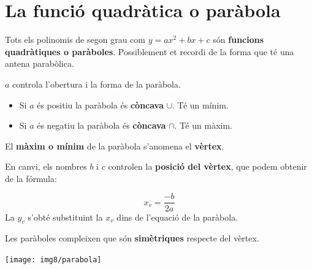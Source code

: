 \section{La funció quadràtica o paràbola}

\begin{theorybox}


Tots els polinomis de segon grau com $y=ax^2+bx+c$ són \textbf{funcions quadràtiques o paràboles}. Possiblement et recordi de la forma que té una antena parabòlica.


$a$ controla l'obertura i la forma de la paràbola. 
\begin{itemize}
	\item Si $a$ és positiu la paràbola és \textbf{còncava} $\cup$. Té un mínim.
	\item Si $a$ és negatiu la paràbola és \textbf{còncava} $\cap$. Té un màxim.
\end{itemize}

El \textbf{màxim o mínim} de la paràbola s'anomena el \textbf{vèrtex}.

En canvi, els nombres $b$ i $c$ controlen la \textbf{posició del vèrtex}, que podem obtenir de la fórmula:

\begin{minipage}{0.7\textwidth}
\begin{equation*}
x_v = \frac{-b}{2a}
\end{equation*}
La $y_v$ s'obté substituint la $x_v$ dins de l'equació de la paràbola.

Les paràboles compleixen que són \textbf{simètriques} respecte del vèrtex.
\end{minipage}
\begin{minipage}{0.25\textwidth}
	\centering
	\texttt{[image: img8/parabola]}
\end{minipage}
\end{theorybox}	


